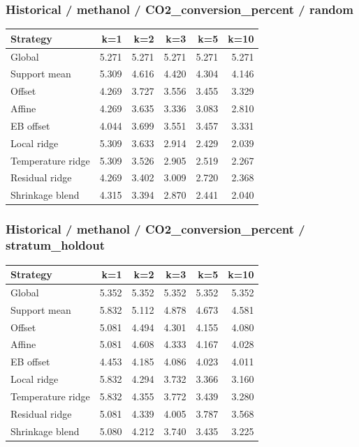 \subsubsection*{Historical / methanol / CO2\_conversion\_percent / random}
\begin{center}\small
\begin{tabular}{lrrrrr}
\toprule
Strategy & k=1 & k=2 & k=3 & k=5 & k=10 \\
\midrule
Global & 5.271 & 5.271 & 5.271 & 5.271 & 5.271 \\
Support mean & 5.309 & 4.616 & 4.420 & 4.304 & 4.146 \\
Offset & 4.269 & 3.727 & 3.556 & 3.455 & 3.329 \\
Affine & 4.269 & 3.635 & 3.336 & 3.083 & 2.810 \\
EB offset & 4.044 & 3.699 & 3.551 & 3.457 & 3.331 \\
Local ridge & 5.309 & 3.633 & 2.914 & 2.429 & 2.039 \\
Temperature ridge & 5.309 & 3.526 & 2.905 & 2.519 & 2.267 \\
Residual ridge & 4.269 & 3.402 & 3.009 & 2.720 & 2.368 \\
Shrinkage blend & 4.315 & 3.394 & 2.870 & 2.441 & 2.040 \\
\bottomrule
\end{tabular}
\end{center}

\subsubsection*{Historical / methanol / CO2\_conversion\_percent / stratum\_holdout}
\begin{center}\small
\begin{tabular}{lrrrrr}
\toprule
Strategy & k=1 & k=2 & k=3 & k=5 & k=10 \\
\midrule
Global & 5.352 & 5.352 & 5.352 & 5.352 & 5.352 \\
Support mean & 5.832 & 5.112 & 4.878 & 4.673 & 4.581 \\
Offset & 5.081 & 4.494 & 4.301 & 4.155 & 4.080 \\
Affine & 5.081 & 4.608 & 4.333 & 4.167 & 4.028 \\
EB offset & 4.453 & 4.185 & 4.086 & 4.023 & 4.011 \\
Local ridge & 5.832 & 4.294 & 3.732 & 3.366 & 3.160 \\
Temperature ridge & 5.832 & 4.355 & 3.772 & 3.439 & 3.280 \\
Residual ridge & 5.081 & 4.339 & 4.005 & 3.787 & 3.568 \\
Shrinkage blend & 5.080 & 4.212 & 3.740 & 3.435 & 3.225 \\
\bottomrule
\end{tabular}
\end{center}

